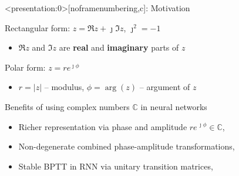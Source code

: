 \documentclass{beamer}
\newcommand{\cplx}{\mathbb{C}}
\newcommand{\iu}{{\jmath}}
\begin{document}
\begin{frame}<presentation:0>[noframenumbering,c]{\insertsection: Motivation}

  Rectangular form: $z = \Re{z} + \iu \Im{z}$, $\iu^2 = -1$
  \begin{itemize}
    \item $\Re{z}$ and $\Im{z}$ are \textbf{real} and \textbf{imaginary} parts of $z$
  \end{itemize}

  \smallskip
  Polar form: $z = r e^{\iu \phi}$
  \begin{itemize}
    \item $r = \lvert z \rvert$ -- modulus, $\phi = \arg{\!(z)}$ -- argument of $z$
  \end{itemize}

  \bigskip
  Benefits of using complex numbers $\cplx$ in neural networks
  \begin{itemize}
    \item Richer representation via phase and amplitude $
        r e^{\,\iu \phi} \in \cplx
      $,
      {\tiny \\ \quad
        \citep{reichert_neuronal_2014}}

    \smallskip
    \item Non-degenerate combined phase-amplitude transformations,
      {\tiny \\ \quad
        \citep{hirose_generalization_2012}}

    \smallskip
    \item Stable BPTT in RNN via unitary transition matrices,
      {\tiny \\ \quad
        \citep{arjovsky_unitary_2016,wisdom_full-capacity_2016}}
  \end{itemize}

\end{frame}
\end{document}
